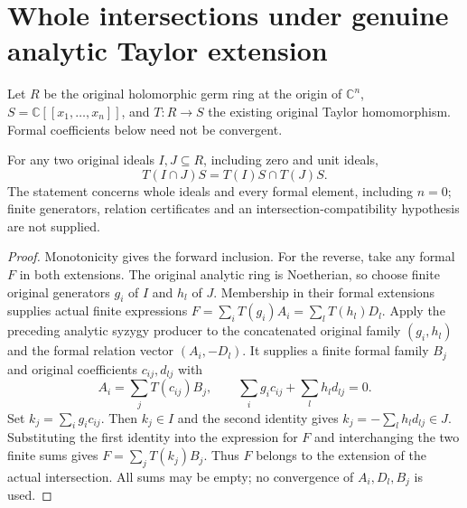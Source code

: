 \section{Whole intersections under genuine analytic Taylor extension}

Let $R$ be the original holomorphic germ ring at the origin of $\mathbb C^n$,
$S=\mathbb C[[x_1,\ldots,x_n]]$, and $T:R\to S$ the existing original Taylor
homomorphism. Formal coefficients below need not be convergent.

\begin{theorem}
\label{hir:actual-formal-extension-whole-ideal-intersections}
\leanok
For any two original ideals $I,J\subseteq R$, including zero and unit ideals,
\[
 T(I\cap J)S= T(I)S\cap T(J)S.
\]
The statement concerns whole ideals and every formal element, including $n=0$;
finite generators, relation certificates and an intersection-compatibility
hypothesis are not supplied.
\end{theorem}
\begin{proof}
Monotonicity gives the forward inclusion. For the reverse, take any formal
$F$ in both extensions. The original analytic ring is Noetherian, so choose
finite original generators $g_i$ of $I$ and $h_l$ of $J$. Membership in their
formal extensions supplies actual finite expressions
$F=\sum_i T(g_i)A_i=\sum_l T(h_l)D_l$.
Apply the preceding analytic syzygy producer to the concatenated original
family $(g_i,h_l)$ and the formal relation vector $(A_i,-D_l)$.
It supplies a finite formal family $B_j$ and original coefficients
$c_{ij},d_{lj}$ with
\[
 A_i=\sum_jT(c_{ij})B_j,\qquad
 \sum_i g_i c_{ij}+\sum_l h_l d_{lj}=0.
\]
Set $k_j=\sum_i g_i c_{ij}$. Then $k_j\in I$ and the second identity gives
$k_j=-\sum_l h_l d_{lj}\in J$. Substituting the first identity into the
expression for $F$ and interchanging the two finite sums gives
$F=\sum_j T(k_j)B_j$. Thus $F$ belongs to the extension of the actual
intersection. All sums may be empty; no convergence of $A_i,D_l,B_j$ is used.
\end{proof}
